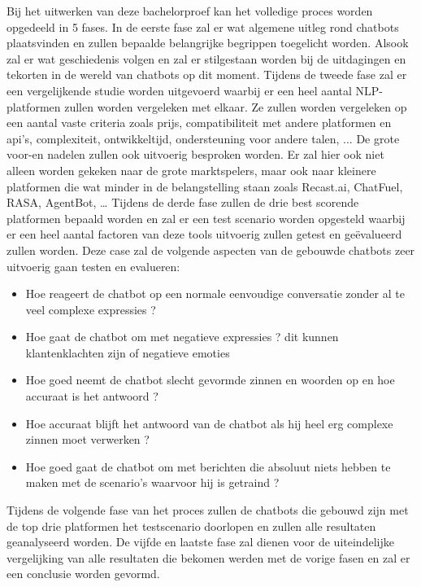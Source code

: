 Bij het uitwerken van deze bachelorproef kan het volledige proces worden opgedeeld in 5 fases.
In de eerste fase zal er wat algemene uitleg rond chatbots plaatsvinden en zullen bepaalde belangrijke begrippen toegelicht worden. Alsook zal er wat geschiedenis volgen en zal er stilgestaan worden bij de uitdagingen en tekorten in de wereld van chatbots op dit moment.
Tijdens de tweede fase zal er een vergelijkende studie worden uitgevoerd waarbij er een heel aantal NLP-platformen zullen worden vergeleken met elkaar. Ze zullen worden vergeleken op een aantal vaste criteria zoals prijs, compatibiliteit met andere platformen en api’s, complexiteit, ontwikkeltijd, ondersteuning voor andere talen, ... De grote voor-en nadelen zullen ook uitvoerig besproken worden. Er zal hier ook niet alleen worden gekeken naar de grote marktspelers, maar ook naar kleinere platformen die wat minder in de belangstelling staan zoals Recast.ai, ChatFuel, RASA, AgentBot, …
Tijdens de derde fase zullen de drie best scorende platformen bepaald worden en zal er een test scenario worden opgesteld waarbij er een heel aantal factoren van deze tools uitvoerig zullen getest en geëvalueerd zullen worden. Deze case zal de volgende aspecten van de gebouwde chatbots zeer uitvoerig gaan testen en evalueren:

\begin{itemize}
    \item Hoe reageert de chatbot op een normale eenvoudige conversatie zonder al te veel complexe expressies ?
    \item Hoe gaat de chatbot om met negatieve expressies ? dit kunnen klantenklachten zijn of negatieve emoties
    \item Hoe goed neemt de chatbot slecht gevormde zinnen en woorden op en hoe accuraat is het antwoord ?
    \item Hoe accuraat blijft het antwoord van de chatbot als hij heel erg complexe zinnen moet verwerken ?
    \item Hoe goed gaat de chatbot om met berichten die absoluut niets hebben te maken met de scenario’s waarvoor hij is getraind ?
\end{itemize}

\bigskip
Tijdens de volgende fase van het proces zullen de chatbots die gebouwd zijn met de top drie platformen het testscenario doorlopen en zullen alle resultaten geanalyseerd worden.
De vijfde en laatste fase zal dienen voor de uiteindelijke vergelijking van alle resultaten die bekomen werden met de vorige fasen en zal er een conclusie worden gevormd.


